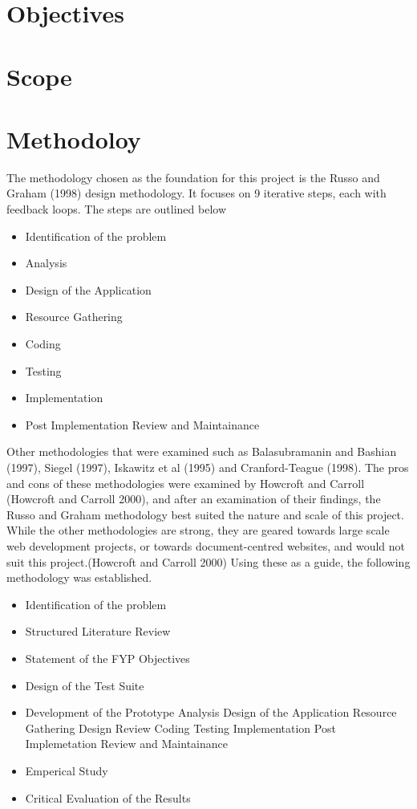 \section{Objectives}

\section{Scope}


\section{Methodoloy}

The methodology chosen as the foundation for this project is the Russo and Graham (1998) design methodology. It focuses on 9 iterative steps, each with feedback loops. The steps are outlined below


\begin {itemize}
\item Identification of the problem
\item Analysis
\item Design of the Application
\item Resource Gathering
\item Coding
\item Testing
\item Implementation
\item Post Implementation Review and Maintainance
\end{itemize}

Other methodologies that were examined such as Balasubramanin and Bashian (1997), Siegel (1997), Iskawitz et al (1995) and Cranford-Teague (1998). The pros and cons of these methodologies were examined by Howcroft and Carroll (Howcroft and Carroll 2000), and after an examination of their findings, the Russo and Graham methodology best suited the nature and scale of this project. While the other methodologies are strong, they are geared towards large scale web development projects, or towards document-centred websites, and would not suit this project.(Howcroft and Carroll 2000)
Using these as a guide, the following methodology was established.

\begin {itemize}
\item Identification of the problem
\item Structured Literature Review
\item Statement of the FYP Objectives
\item Design of the Test Suite
\item Development of the Prototype
\subitem Analysis
\subitem Design of the Application
\subitem Resource Gathering
\subitem Design Review
\subitem Coding
\subitem Testing
\subitem Implementation
\subitem Post Implemetation Review and Maintainance
\item Emperical Study
\item Critical Evaluation of the Results
\end{itemize}


